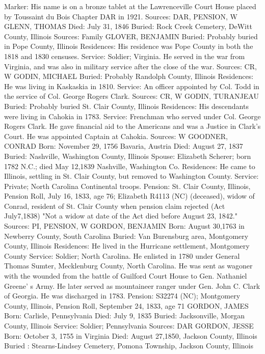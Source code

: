 Marker: His name is on a bronze tablet at the Lawrenceville Court House placed by Toussaint du Bois Chapter DAR in 1921. 
Sources: DAR, PENSION, W 
GLENN, THOMAS 
Died: July 31, 1846 
Buried: Rock Creek Cemetery, DeWitt County, Illinois 
Sources: Family 
GLOVER, BENJAMIN 
Buried: Probably buried in Pope County, Illinois 
Residences: His residence was Pope County in both the 1818 and 1830 censuses. 
Service: Soldier; Virginia. He served in the war from Virginia, and was also in military service after the close of the war. 
Sources: CR, W 
GODIN, MICHAEL 
Buried: Probably Randolph County, Illinois 
Residences: He was living in Kaskaskia in 1810. 
Service: An officer appointed by Col. Todd in the service of Col. George Rogers Clark. 
Sources: CR, W 
GODIN, TURANJEAU 
Buried: Probably buried St. Clair County, Illinois 
Residences: His descendants were living in Cahokia in 1783. 
Service: Frenchman who served under Col. George Rogers Clark. He gave finan­cial aid to the Americans and was a Justice in Clark's Court. He was ap­pointed Captain at Cahokia. 
Sources: W 
GOODNER, CONRAD 
Born: November 29, 1756 Bavaria, Austria 
Died: August 27, 1837 
Buried: Nashville, Washington County, Illinois 
Spouse: Elizabeth Scherer; born 1782 N.C.; died May 12,1839 Nashville, Wash­ington Co. 
Residences: He came to Illinois, settling in St. Clair County, but removed to Washington County. 
Service: Private; North Carolina Continental troops. 
Pension: St. Clair County, Illinois, Pension Roll, July 16, 1833, age 76; Elizabeth R4113 (NC) (deceased), widow of Conrad, resident of St. Clair County when pension claim rejected (Act July7,1838) "Not a widow at date of the Act died before August 23, 1842." 
Sources: PI, PENSION, W 
GORDON, BENJAMIN 
Born: August 30,1763 in Newberry County, South Carolina 
Buried: Van Burensburg area, Montgomery County, Illinois 
Residences: He lived in the Hurricane settlement, Montgomery County 
Service: Soldier; North Carolina. He enlisted in 1780 under General Thomas Sumter, Mecklenburg County, North Carolina. He was sent as wagoner with the wounded from the battle of Guilford Court House to Gen. Nathaniel Greene' s Army. He later served as mountaineer ranger under Gen. John C. Clark of Georgia. He was discharged in 1783. 
Pension: S32274 (NC); Montgomery County, Illinois, Pension Roll, September 24, 1833, age 71 
GORDON, JAMES 
Born: Carlisle, Pennsylvania 
Died: July 9, 1835 
Buried: Jacksonville, Morgan County, Illinois 
Service: Soldier; Pennsylvania 
Sources: DAR 
GORDON, JESSE 
Born: October 3, 1755 in Virginia 
Died: August 27,1850, Jackson County, Illinois Buried : Stearns-Lindsey Cemetery, Pomona Township, Jackson County, Illinois 
